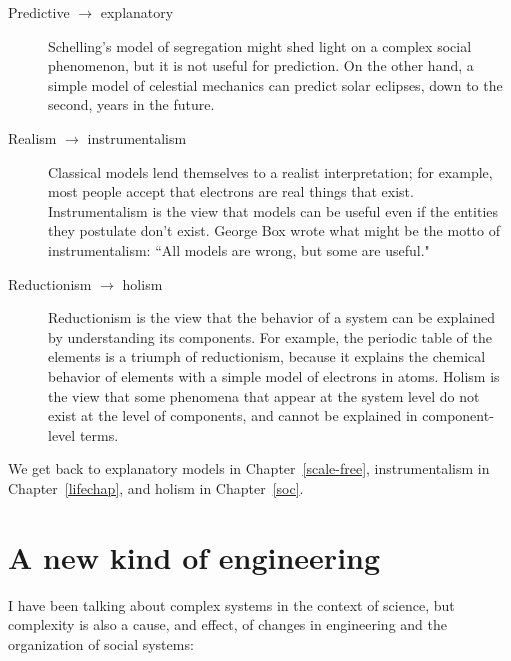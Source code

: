 \documentclass[12pt]{book}
\theoremstyle{exercise}
\begin{document}
\begin{description}

\item[Predictive $\rightarrow$ explanatory] Schelling's model
of segregation might shed light on a complex social phenomenon, but
it is not useful for prediction.  On the other hand, a simple model
of celestial mechanics can predict solar eclipses, down to the second,
years in the future.


\item[Realism $\rightarrow$ instrumentalism] Classical models lend
  themselves to a realist interpretation; for example, most people
  accept that electrons are real things that exist.  Instrumentalism
  is the view that models can be useful even if the entities they
  postulate don't exist.  George Box wrote what might be the motto of
  instrumentalism: ``All models are wrong, but some are useful."


\item[Reductionism $\rightarrow$ holism] Reductionism is the view that
  the behavior of a system can be explained by understanding its
  components.  For example, the periodic table of the elements is a
  triumph of reductionism, because it explains the chemical behavior
  of elements with a simple model of electrons in atoms.  Holism
  is the view that some phenomena that appear at the system level do
  not exist at the level of components, and cannot be explained in
  component-level terms.


\end{description}

We get back to explanatory models in Chapter~\ref{scale-free},
instrumentalism in Chapter~\ref{lifechap}, and holism in Chapter~\ref{soc}.


\section{A new kind of engineering}

I have been talking about complex systems in the context of science,
but complexity is also a cause, and effect, of
changes in engineering and the organization of social
systems:

\end{document}
